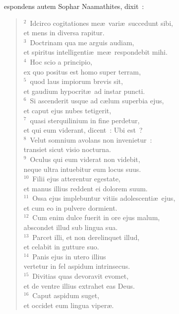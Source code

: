 \bchapter
{}espondens autem Sophar Naamathites, dixit~:
\begin{flushleft}\begin{verse}\vspace{6pt}${}^{2}$~Idcirco cogitationes me\ae\ vari\ae\ succedunt sibi,\\ et mens in diversa rapitur.\\
${}^{3}$~Doctrinam qua me arguis audiam,\\ et spiritus intelligenti\ae\ me\ae\ respondebit mihi.\\
${}^{4}$~Hoc scio a principio,\\ ex quo positus est homo super terram,\\
${}^{5}$~quod laus impiorum brevis sit,\\ et gaudium hypocrit\ae\ ad instar puncti.\\
${}^{6}$~Si ascenderit usque ad c\ae lum superbia ejus,\\ et caput ejus nubes tetigerit,\\
${}^{7}$~quasi sterquilinium in fine perdetur,\\ et qui eum viderant, dicent~: Ubi est~?\\
${}^{8}$~Velut somnium avolans non invenietur~:\\ transiet sicut visio nocturna.\\
${}^{9}$~Oculus qui eum viderat non videbit,\\ neque ultra intuebitur eum locus suus.\\
${}^{10}$~Filii ejus atterentur egestate,\\ et manus illius reddent ei dolorem suum.\\
${}^{11}$~Ossa ejus implebuntur vitiis adolescenti\ae\ ejus,\\ et cum eo in pulvere dormient.\\
${}^{12}$~Cum enim dulce fuerit in ore ejus malum,\\ abscondet illud sub lingua sua.\\
${}^{13}$~Parcet illi, et non derelinquet illud,\\ et celabit in gutture suo.\\
${}^{14}$~Panis ejus in utero illius\\ vertetur in fel aspidum intrinsecus.\\
${}^{15}$~Divitias quas devoravit evomet,\\ et de ventre illius extrahet eas Deus.\\
${}^{16}$~Caput aspidum suget,\\ et occidet eum lingua viper\ae .\\

\end{verse}
\end{flushleft}
